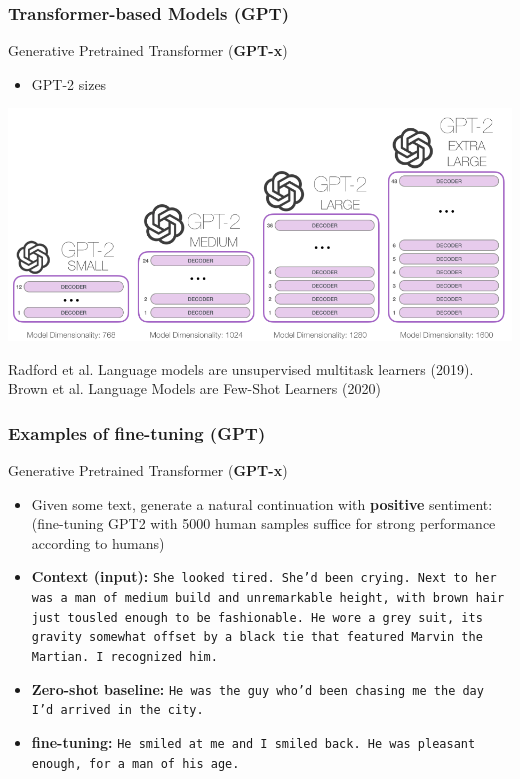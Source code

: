 \documentclass[10pt]{beamer}
\begin{document}
\begin{frame}
  \frametitle{Transformer-based Models (GPT)}
{\color{red}Generative Pretrained Transformer (\textbf{GPT-x})}
\begin{itemize}
\item GPT-2 sizes
\end{itemize}
\begin{center}
	\includegraphics[width=.7\columnwidth]{images/gpt2}
\end{center}
\vspace{.05cm}

\scriptsize{Radford et al. Language models are unsupervised multitask learners (2019).\\
Brown et al. Language Models are Few-Shot Learners (2020)}
\end{frame}


\begin{frame}
  \frametitle{Examples of fine-tuning (GPT)}
{\color{red}Generative Pretrained Transformer (\textbf{GPT-x})}
\begin{itemize}[<+->]
\item {\color{blue}{Task:}} Given some text, generate a natural continuation with \textbf{positive} sentiment:
(fine-tuning GPT2 with 5000 human samples suffice for strong performance according to humans)
\item \textbf{Context (input):} \texttt{She looked tired. She’d been crying.
Next to her was a man of medium build and unremarkable height, with brown hair just tousled enough to be fashionable. He wore a grey suit, its gravity somewhat offset by a black tie that featured Marvin the Martian. I recognized him.}
\item \textbf{Zero-shot baseline:}
\texttt{He was the guy who’d been chasing me the day I’d arrived in the city.}
\item \textbf{fine-tuning:}
\texttt{He smiled at me and I smiled back. He was pleasant enough, for a man of his age.}
\end{itemize}
\end{frame}
\end{document}
